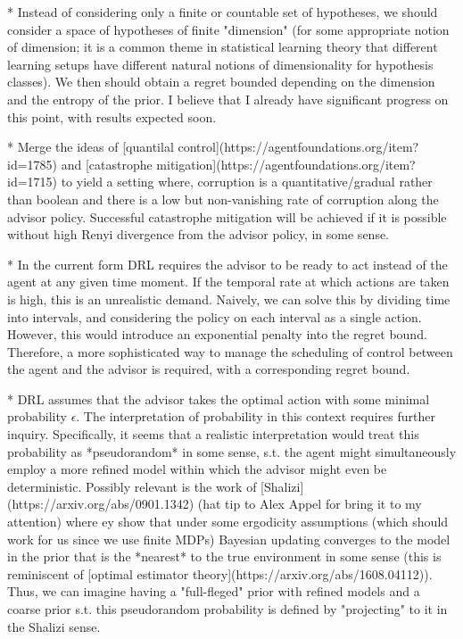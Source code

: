 \documentclass[a4paper]{article}
\begin{document}
* Instead of considering only a finite or countable set of hypotheses, we should consider a space of hypotheses of finite "dimension" (for some appropriate notion of dimension; it is a common theme in statistical learning theory that different learning setups have different natural notions of dimensionality for hypothesis classes). We then should obtain a regret bounded depending on the dimension and the entropy of the prior. I believe that I already have significant progress on this point, with results expected soon.

* Merge the ideas of [quantilal control](https://agentfoundations.org/item?id=1785) and [catastrophe mitigation](https://agentfoundations.org/item?id=1715) to yield a setting where, corruption is a quantitative/gradual rather than boolean and there is a low but non-vanishing rate of corruption along the advisor policy. Successful catastrophe mitigation will be achieved if it is possible without high Renyi divergence from the advisor policy, in some sense.

* In the current form DRL requires the advisor to be ready to act instead of the agent at any given time moment. If the temporal rate at which actions are taken is high, this is an unrealistic demand. Naively, we can solve this by dividing time into intervals, and considering the policy on each interval as a single action. However, this would introduce an exponential penalty into the regret bound. Therefore, a more sophisticated way to manage the scheduling of control between the agent and the advisor is required, with a corresponding regret bound.

* DRL assumes that the advisor takes the optimal action with some minimal probability $\epsilon$. The interpretation of probability in this context requires further inquiry. Specifically, it seems that a realistic interpretation would treat this probability as *pseudorandom* in some sense, s.t. the agent might simultaneously employ a more refined model within which the advisor might even be deterministic. Possibly relevant is the work of [Shalizi](https://arxiv.org/abs/0901.1342) (hat tip to Alex Appel for bring it to my attention) where ey show that under some ergodicity assumptions (which should work for us since we use finite MDPs) Bayesian updating converges to the model in the prior that is the *nearest* to the true environment in some sense (this is reminiscent of [optimal estimator theory](https://arxiv.org/abs/1608.04112)). Thus, we can imagine having a "full-fleged" prior with refined models and a coarse prior s.t. this pseudorandom probability is defined by "projecting" to it in the Shalizi sense.
\end{document}

